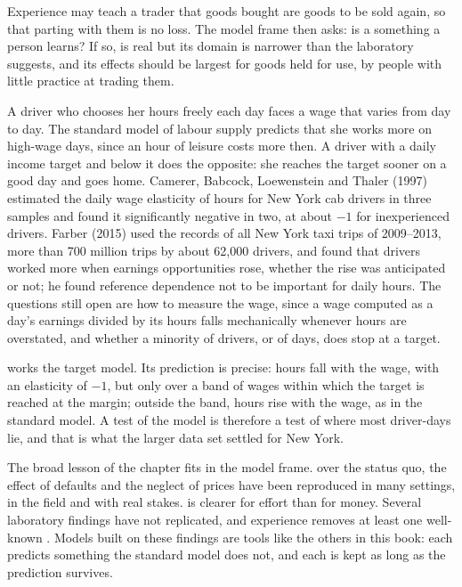Experience may teach a trader that goods bought are goods to be sold again, so that parting with them is
no loss. The model frame then asks: is a  something a person learns? If so,  is real but its domain is narrower than the laboratory suggests, and its effects should be
largest for goods held for use, by people with little practice at trading them.

\begin{debate}
A driver who chooses her hours freely each day faces a wage that varies from day to day. The standard
model of labour supply predicts that she works more on high-wage days, since an hour of leisure costs
more then. A driver with a daily income target and  below it does the opposite: she
reaches the target sooner on a good day and goes home. Camerer, Babcock, Loewenstein and Thaler (1997)
estimated the daily wage elasticity of hours for New York cab drivers in three samples and found it
significantly negative in two, at about $-1$ for inexperienced drivers. Farber (2015) used the records of
all New York taxi trips of 2009--2013, more than 700 million trips by about 62,000 drivers, and found
that drivers worked more when earnings opportunities rose, whether the rise was anticipated or not; he
found reference dependence not to be important for daily hours. The questions still open are how to measure the
wage, since a wage computed as a day's earnings divided by its hours falls mechanically whenever hours
are overstated, and whether a minority of drivers, or of days, does stop at a target.
\end{debate}

 works the target model. Its prediction is precise: hours fall
with the wage, with an elasticity of $-1$, but only over a band of wages within which the target is
reached at the margin; outside the band, hours rise with the wage, as in the standard model. A test of
the model is therefore a test of where most driver-days lie, and that is what the larger data set
settled for New York.

The broad lesson of the chapter fits in the model frame.  over the status quo, the effect
of defaults and the neglect of  prices have been reproduced in many settings, in the field and
with real stakes.  is clearer for effort than for money. Several laboratory findings have
not replicated, and experience removes at least one well-known . Models built on these findings
are tools like the others in this book: each predicts something the standard model does not, and each
is kept as long as the prediction survives.

